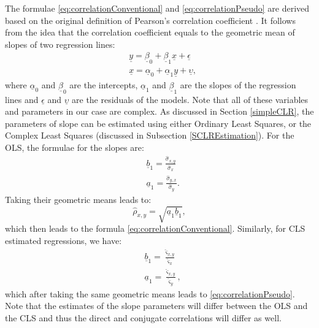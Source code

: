\documentclass[
]{book}
\begin{document}
The formulae \eqref{eq:correlationConventional} and \eqref{eq:correlationPseudo} are derived based on the original definition of Pearson's correlation coefficient \citep{refPearson}. It follows from the idea that the correlation coefficient equals to the geometric mean of slopes of two regression lines:
\begin{equation}
    \begin{aligned}
        &\underline{y} = \underline{\beta}_0 + \underline{\beta}_1 \underline{x} + \underline{\epsilon} \\
        &\underline{x} = \underline{\alpha}_0 + \underline{\alpha}_1 \underline{y} + \underline{\upsilon} ,
    \end{aligned}
    \label{eq:twoRegressions}
\end{equation}
where \(\underline{\alpha}_0\) and \(\underline{\beta}_0\) are the intercepts, \(\underline{\alpha}_1\) and \(\underline{\beta}_1\) are the slopes of the regression lines and \(\underline{\epsilon}\) and \(\underline{\upsilon}\) are the residuals of the models. Note that all of these variables and parameters in our case are complex. As discussed in Section \ref{simpleCLR}, the parameters of slope can be estimated using either Ordinary Least Squares, or the Complex Least Squares (discussed in Subsection \ref{SCLREstimation}). For the OLS, the formulae for the slopes are:
\begin{equation}
    \begin{aligned}
        &\underline{b}_1 = \frac{\hat{\sigma}_{x,y}}{\hat{\sigma}_x} \\
        &\underline{a}_1 = \frac{\hat{\sigma}_{y,x}}{\hat{\sigma}_y} .
    \end{aligned}
    \label{eq:twoRegressionsOLS}
\end{equation}
Taking their geometric means leads to:
\begin{equation}
    \hat{\rho}_{x,y} = \sqrt{\underline{a}_1 \underline{b}_1},
    \label{eq:correlationConventionalEstimate}
\end{equation}
which then leads to the formula \eqref{eq:correlationConventional}. Similarly, for CLS estimated regressions, we have:
\begin{equation}
    \begin{aligned}
        &\underline{b}_1 = \frac{\hat{\varsigma}_{x,y}}{\hat{\varsigma}_x} \\
        &\underline{a}_1 = \frac{\hat{\varsigma}_{x,y}}{\hat{\varsigma}_y} ,
    \end{aligned}
    \label{eq:twoRegressionsCLS}
\end{equation}
which after taking the same geometric means leads to \eqref{eq:correlationPseudo}. Note that the estimates of the slope parameters will differ between the OLS and the CLS and thus the direct and conjugate correlations will differ as well.
\end{document}
